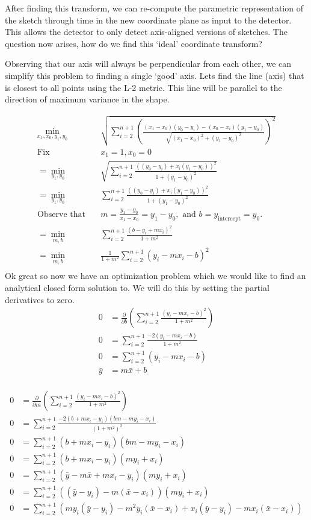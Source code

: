\documentclass{article}
\begin{document}
After finding this transform, we can re-compute the parametric representation of the sketch through time in the new coordinate plane as input to the detector. This allows the detector to only detect axis-aligned versions of sketches. The question now arises, how do we find this `ideal' coordinate transform? 

Observing that our axis will always be perpendicular from each other, we can simplify this problem to finding a single `good' axis. Lets find the line (axis) that is closest to all points using the L-2 metric. This line will be parallel to the direction of maximum variance in the shape. 

\begin{align*}
\min_{x_1,x_0,y_1,y_0} & \sqrt{\sum_{i=2}^{n+1} \left( \frac{(x_1 - x_0)(y_0 - y_i) - (x_0 - x_i)(y_1 - y_0)}{\sqrt{(x_1 - x_0)^2 + (y_1 - y_0)^2}}\right)^2}\\
\text{Fix} \quad & x_1 = 1, x_0 = 0\\
 = \min_{y_1,y_0} & \sqrt{\sum_{i=2}^{n+1} \frac{((y_0 - y_i) + x_i(y_1 - y_0))^2}{1 + (y_1 - y_0)^2}}\\
= \min_{y_1,y_0} &\sum_{i=2}^{n+1} \frac{((y_0 - y_i) + x_i(y_1 - y_0))^2}{1 + (y_1 - y_0)^2}\\
\text{Observe that} \quad & m = \frac{y_1 - y_0}{x_1 - x_0} = y_1 - y_0, \text{ and } b = y_{\text{intercept}} = y_0.\\
= \min_{m,b} &\sum_{i=2}^{n+1} \frac{(b - y_i + mx_i)^2}{1 + m^2}\\
= \min_{m,b} &\frac{1}{1+m^2}\sum_{i=2}^{n+1}(y_i - mx_i - b)^2\\
\end{align*}
Ok great so now we have an optimization problem which we would like to find an analytical closed form solution to. We will do this by setting the partial derivatives to zero.
\begin{align*}
 0 & = \frac{\partial}{\partial b}\left(\sum_{i=2}^{n+1}\frac{(y_i - mx_i - b)^2}{1+m^2}\right)\\
 0 & = \sum_{i=2}^{n+1}\frac{-2(y_i - mx_i - b)}{1 + m^2}\\
 0 & = \sum_{i=2}^{n+1}(y_i - mx_i - b)\\
 \bar{y} & = m \bar{x} + b\\
\end{align*}

\begin{align*}
0 & = \frac{\partial}{\partial m}\left(\sum_{i=2}^{n+1}\frac{(y_i - mx_i - b)^2}{1+m^2}\right)\\
0 & = \sum_{i=2}^{n+1}\frac{-2(b + mx_i - y_i)(bm - my_i - x_i)}{(1+m^2)^2}\\
0 & = \sum_{i=2}^{n+1}(b + mx_i - y_i)(bm - my_i - x_i)\\
0 & = \sum_{i=2}^{n+1}(b + mx_i - y_i)(my_i + x_i)\\
0 & = \sum_{i=2}^{n+1}(\bar{y} - m\bar{x} + mx_i - y_i)(my_i + x_i)\\
0 & = \sum_{i=2}^{n+1}((\bar{y} -y_i)- m(\bar{x} - x_i))(my_i + x_i)\\
0 & = \sum_{i=2}^{n+1}(my_i(\bar{y} -y_i)- m^2y_i(\bar{x} - x_i) + x_i(\bar{y} -y_i) - mx_i(\bar{x} - x_i))\\
\end{align*}
\end{document}
